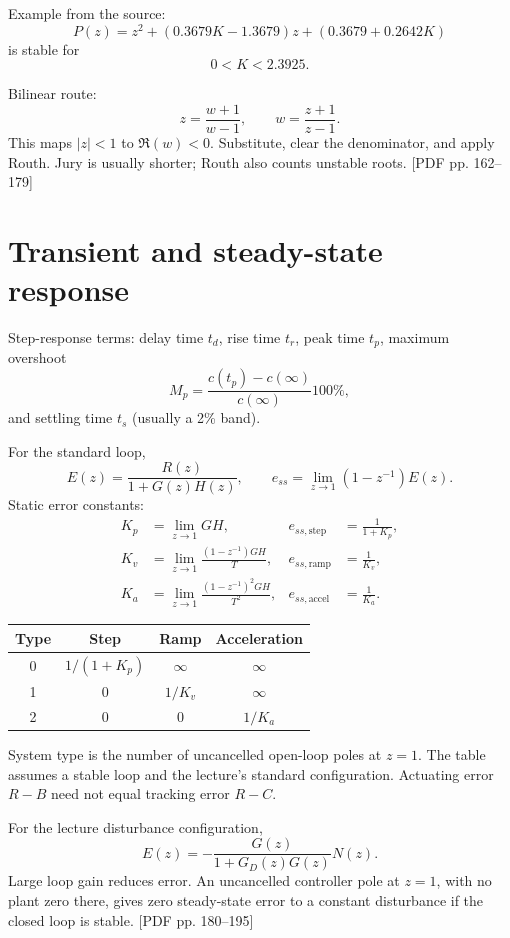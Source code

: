 \documentclass[10pt]{article}
\newcommand{\src}[1]{\hfill{\small\color{gray}[PDF pp. #1]}}
\newcommand{\weeklabel}[1]{\par\smallskip\noindent{\color{blue!60!black}\textbf{#1}}\par\smallskip}
\begin{document}
Example from the source:
\[
P(z)=z^2+(0.3679K-1.3679)z+(0.3679+0.2642K)
\]
is stable for
\[
0<K<2.3925.
\]

Bilinear route:
\[
z=\frac{w+1}{w-1},\qquad w=\frac{z+1}{z-1}.
\]
This maps $|z|<1$ to $\Re(w)<0$. Substitute, clear the denominator, and apply Routh. Jury is usually shorter; Routh also counts unstable roots. \src{162--179}

\section{Transient and steady-state response}

\weeklabel{Week 4}

Step-response terms: delay time $t_d$, rise time $t_r$, peak time $t_p$, maximum overshoot
\[
M_p=\frac{c(t_p)-c(\infty)}{c(\infty)}100\%,
\]
and settling time $t_s$ (usually a 2\% band).

For the standard loop,
\[
E(z)=\frac{R(z)}{1+G(z)H(z)},\qquad
e_{ss}=\lim_{z\to1}(1-z^{-1})E(z).
\]
Static error constants:
\begin{align*}
K_p&=\lim_{z\to1}GH,&e_{ss,\text{step}}&=\frac{1}{1+K_p},\\
K_v&=\lim_{z\to1}\frac{(1-z^{-1})GH}{T},&e_{ss,\text{ramp}}&=\frac{1}{K_v},\\
K_a&=\lim_{z\to1}\frac{(1-z^{-1})^2GH}{T^2},&e_{ss,\text{accel}}&=\frac{1}{K_a}.
\end{align*}

\begin{center}
\begin{tabular}{c c c c}
\toprule
Type & Step & Ramp & Acceleration\\
\midrule
0 & $1/(1+K_p)$ & $\infty$ & $\infty$\\
1 & $0$ & $1/K_v$ & $\infty$\\
2 & $0$ & $0$ & $1/K_a$\\
\bottomrule
\end{tabular}
\end{center}

System type is the number of uncancelled open-loop poles at $z=1$. The table assumes a stable loop and the lecture's standard configuration. Actuating error $R-B$ need not equal tracking error $R-C$.

For the lecture disturbance configuration,
\[
E(z)=-\frac{G(z)}{1+G_D(z)G(z)}N(z).
\]
Large loop gain reduces error. An uncancelled controller pole at $z=1$, with no plant zero there, gives zero steady-state error to a constant disturbance if the closed loop is stable. \src{180--195}
\end{document}
